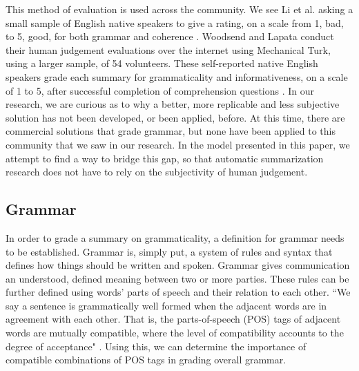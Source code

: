 \documentclass[11pt,a4paper]{article}
\begin{document}
\begin{multicols}{2}
This method of evaluation is used across the community. We see Li et al. asking a small sample of English native speakers to give a rating, on a scale from 1, bad, to 5, good, for both grammar and coherence \cite{li2014}. Woodsend and Lapata conduct their human judgement evaluations over the internet using Mechanical Turk, using a larger sample, of 54 volunteers. These self-reported native English speakers grade each summary for grammaticality and informativeness, on a scale of 1 to 5, after successful completion of comprehension questions \cite{woodsend2012}. In our research, we are curious as to why a better, more replicable and less subjective solution has not been developed, or been applied, before. At this time, there are commercial solutions that grade grammar, but none have been applied to this community that we saw in our research. In the model presented in this paper, we attempt to find a way to bridge this gap, so that automatic summarization research does not have to rely on the subjectivity of human judgement.


\subsection{Grammar}
In order to grade a summary on grammaticality, a definition for grammar needs to be established. Grammar is, simply put, a system of rules and syntax that defines how things should be written and spoken. Grammar gives communication an understood, defined meaning between two or more parties. These rules can be further defined using words' parts of speech and their relation to each other. ``We say a sentence is grammatically well formed when the adjacent words are in agreement with each other. That is, the parts-of-speech (POS) tags of adjacent words are mutually compatible, where the level of compatibility accounts to the degree of acceptance" \cite{Vadlapudi2010}. Using this, we can determine the importance of compatible combinations of POS tags in grading overall grammar.



\end{multicols}
\end{document}
